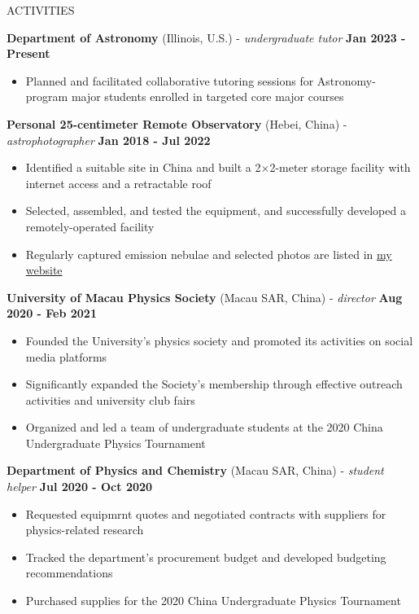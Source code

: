 \documentclass[11pt]{article}
\begin{document}
\begin{section}{ACTIVITIES}

\textbf{Department of Astronomy} (Illinois, U.S.) - \textit{undergraduate tutor} \hfill \textbf{Jan 2023 - Present}
\begin{itemize}[leftmargin=1.5em]
    \item Planned and facilitated collaborative tutoring sessions for Astronomy-program major students enrolled in targeted core major courses 
\end{itemize}

\textbf{Personal 25-centimeter Remote Observatory} (Hebei, China) - \textit{astrophotographer} \hfill \textbf{Jan 2018 - Jul 2022}
\begin{itemize}[leftmargin=1.5em]
    \item Identified a suitable site in China and built a 2$\times$2-meter storage facility with internet access and a retractable roof
    \item Selected, assembled, and tested the equipment, and successfully developed a remotely-operated facility
    \item Regularly captured emission nebulae and selected photos are listed in \href{https://cheysen.fit/astrophotography/}{my website}
\end{itemize}

\textbf{University of Macau Physics Society} (Macau SAR, China) - \textit{director} \hfill \textbf{Aug 2020 - Feb 2021}
\begin{itemize}[leftmargin=1.5em]
    \item Founded the University's physics society and promoted its activities on social media platforms
    \item Significantly expanded the Society's membership through effective outreach activities and university club fairs
    \item Organized and led a team of undergraduate students at the 2020 China Undergraduate Physics Tournament
\end{itemize}


\textbf{Department of Physics and Chemistry} (Macau SAR, China) - \textit{student helper} \hfill \textbf{Jul 2020 - Oct 2020}
\begin{itemize}[leftmargin=1.5em]
    \item Requested equipmrnt quotes and negotiated contracts with suppliers for physics-related research 
    \item Tracked the department's procurement budget and developed budgeting recommendations
    \item Purchased supplies for the 2020 China Undergraduate Physics Tournament
\end{itemize}

\end{section}
\end{document}
